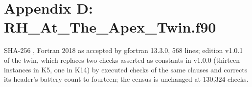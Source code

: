 \documentclass[10pt]{article}
\begin{document}
\endgroup

\hypertarget{appendix-d-rh_at_the_apex_twin.f90}{%
\section{Appendix D:
RH\_At\_The\_Apex\_Twin.f90}\label{appendix-d-rh_at_the_apex_twin.f90}}

SHA-256
\texttt{},
Fortran 2018 as accepted by gfortran 13.3.0, 568 lines; edition v1.0.1
of the twin, which replaces two checks asserted as constants in v1.0.0
(thirteen instances in K5, one in K14) by executed checks of the same
clauses and corrects its header's battery count to fourteen; the census
is unchanged at 130,324 checks.

\begingroup\scriptsize
\end{document}

